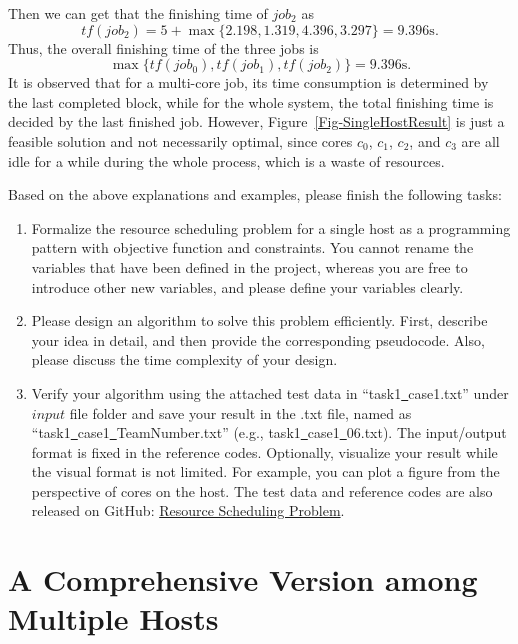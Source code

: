 \documentclass{llncs}
\begin{document}
Then we can get that the finishing time of $job_2$ as $$tf(job_2) = 5 + \max\{ 2.198, 1.319, 4.396, 3.297\} = 9.396\text{s}.$$ Thus, the overall finishing time of the three jobs is $$\max\{tf(job_0), tf(job_1), tf(job_2) \} = 9.396\text{s}.$$ It is observed that for a multi-core job, its time consumption is determined by the last completed block, while for the whole system, the total finishing time is decided by the last finished job. However, Figure~\ref{Fig-SingleHostResult} is just a feasible solution and not necessarily optimal, since cores $c_0$, $c_1$, $c_2$, and $c_3$ are all idle for a while during the whole process, which is a waste of resources. 

\vspace{2mm}

Based on the above explanations and examples, please finish the following tasks:
\begin{enumerate}
  \vspace{-1mm}
  \item Formalize the resource scheduling problem for a single host as a programming pattern with objective function and constraints. You cannot rename the variables that have been defined in the project, whereas you are free to introduce other new variables, and please define your variables clearly.
  
  \item Please design an algorithm to solve this problem efficiently. First, describe your idea in detail, and then provide the corresponding pseudocode. Also, please discuss the time complexity of your design.
  \item Verify your algorithm using the attached test data in ``task1\underline\ case1.txt'' under $input$ file folder and save your result in the .txt file, named as ``task1\underline\ case1\underline\ TeamNumber.txt'' (e.g., task1\underline\ case1\underline\ 06.txt). The input/output format is fixed in the reference codes. Optionally, visualize your result while the visual format is not limited. For example, you can plot a figure from the perspective of cores on the host. The test data and reference codes are also released on GitHub: \href{https://github.com/shiwanghua/SharedFiles/tree/Project-CodeDemo}{Resource Scheduling Problem}.
\end{enumerate}


\section{A Comprehensive Version among Multiple Hosts}
\label{sec-problem2}
\end{document}
